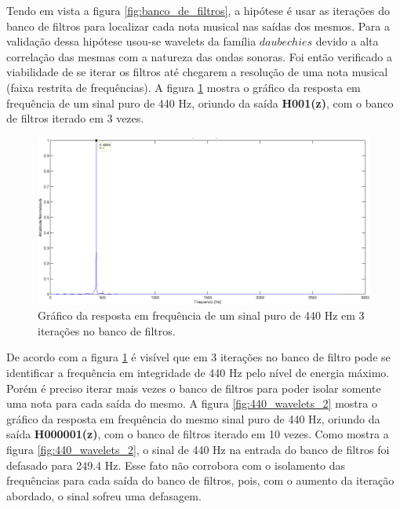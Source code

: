 Tendo em vista a figura \ref{fig:banco_de_filtros}, a hipótese é usar as iterações do banco de filtros para localizar cada nota musical nas saídas dos mesmos. Para a validação dessa hipótese usou-se wavelets da família $daubechies$ devido a alta correlação das mesmas com a natureza das ondas sonoras. Foi então verificado a viabilidade de se iterar os filtros até chegarem a resolução de uma nota musical (faixa restrita de frequências). A figura \ref{fig:440_wavelets_1} mostra o gráfico da resposta em frequência de um sinal puro de 440 Hz, oriundo da saída \textbf{H001(z)}, com o banco de filtros iterado em 3 vezes.

\begin{figure}[h]
    \centering
    \includegraphics[keepaspectratio=true,scale=0.45]{figuras/wavelet_deslocado_1.eps}
  \caption{Gráfico da resposta em frequência de um sinal puro de 440 Hz em 3 iterações no banco de filtros.}
  \label{fig:440_wavelets_1}
\end{figure}

\newpage
De acordo com a figura \ref{fig:440_wavelets_1} é visível que em 3 iterações no banco de filtro pode se identificar a frequência em integridade de 440 Hz pelo nível de energia máximo. Porém é preciso iterar mais vezes o banco de filtros para poder isolar somente uma nota para cada saída do mesmo. A figura \ref{fig:440_wavelets_2} mostra o gráfico da resposta em frequência do mesmo sinal puro de 440 Hz, oriundo da saída \textbf{H000001(z)}, com o banco de filtros iterado em 10 vezes. Como mostra a figura \ref{fig:440_wavelets_2}, o sinal de 440 Hz na entrada do banco de filtros foi defasado para 249.4 Hz. Esse fato não corrobora com o isolamento das frequências para cada saída do banco de filtros, pois, com o aumento da iteração abordado, o sinal sofreu uma defasagem.


